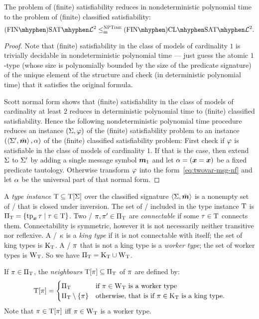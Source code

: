 \begin{remark}
The problem of (finite) satisfiability reduces in nondeterministic polynomial
time to the problem of (finite) classified satisfiability:
\[
  \FinASat{\vFo2} \red\cNP \FinAClSat{\vFo2}.
\]
\end{remark}
\begin{proof}

Note that (finite) satisfiability in the class of models of cardinality $1$ is
trivially decidable in nondeterministic polynomial time --- just guess the
atomic $1$-type (whose size is polynomially bounded by the size of the
predicate signature) of the unique element of the structure and check (in
deterministic polynomial time) that it satisfies the original formula.

Scott normal form shows that (finite) satisfiability in the class of models of
cardinality at least $2$ reduces in deterministic polynomial time to (finite)
classified satisfiability.
Hence the following nondeterministic polynomial time procedure reduces an
instance $(\mathrm{\Sigma}, \varphi)$ of the (finite) satisfiability problem to an instance
$(\left\langle \mathrm{\Sigma'},\bar{\bm{m}} \right\rangle, \alpha)$ of the (finite) classified satisfiability problem:
First check if $\varphi$ is satisfiable in the class of models of cardinality $1$.
If that is the case, then extend $\mathrm{\Sigma}$ to $\mathrm{\Sigma'}$ by adding a single message
symbol $\bm{m}_{1}$ and let $\alpha = (\bm{x} = \bm{x})$ be a fixed predicate tautology.
Otherwise transform $\varphi$ into the form~\cref{eq:twovar-msg-nf} and let
$\alpha$ be the universal part of that normal form.
\end{proof}

A \emph{type instance} $\mathrm{T} \subseteq \mathrm{T}[\mathrm{\Sigma}]$ over the classified signature
$\left\langle \mathrm{\Sigma},\bar{\bm{m}} \right\rangle$ is a nonempty set of \twotypes/ that is closed under
inversion.
The set of \onetypes/ included in the type instance $\mathrm{T}$ is
${\Pi}_{\mathrm{T}} = \left\{\operatorname{tp}_{\bm{x}}\tau\mathrel{}\middle|\mathrel{}\tau\in\mathrm{T}\right\}$.
Two \onetypes/ $\pi,{\pi'} \in {\Pi}_{\mathrm{T}}$ are \emph{connectable} if some
$\tau\in\mathrm{T}$ connects them.
Connectability is symmetric, however it is not necessarily neither transitive
nor reflexive.
A \onetype/ $\kappa$ is a \emph{king type} if it is not connectable with itself;
the set of king types is ${\mathrm{K}}_{\mathrm{T}}$.
A \onetype/ $\pi$ that is not a king type is a \emph{worker type};
the set of worker types is ${\mathrm{W}}_{\mathrm{T}}$.
So we have ${\Pi}_{\mathrm{T}} = {\mathrm{K}}_{\mathrm{T}} \cup {\mathrm{W}}_{\mathrm{T}}$.

If $\pi\in{\Pi}_{\mathrm{T}}$, the \emph{neighbours} $\mathrm{T}[\pi]\subseteq{\Pi}_{\mathrm{T}}$ of $\pi$
are defined by:
\[
  \mathrm{T}[\pi] = \begin{cases}
    {\Pi}_{\mathrm{T}} &\text{if } \pi\in{\mathrm{W}}_{\mathrm{T}} \text{ is a worker type} \\
    {\Pi}_{\mathrm{T}} \setminus \left\{\pi\right\} &\text{otherwise, that is if }
    \pi\in{\mathrm{K}}_{\mathrm{T}} \text{ is a king type.}
  \end{cases}
\]
Note that $\pi \in \mathrm{T}[\pi]$ iff $\pi \in {\mathrm{W}}_{\mathrm{T}}$ is a worker type.


